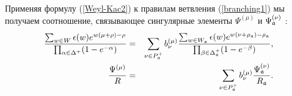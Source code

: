Применяя формулу (\ref{Weyl-Kac2}) к правилам ветвления (\ref{branching1}) мы получаем соотношение, связывающее сингулярные элементы $\Psi ^{\left( \mu\right) }$ и $\Psi _{\mathfrak{a}}^{\left( \nu \right) }$ :
\begin{eqnarray}
\frac{\sum_{w \in W}\epsilon (w )e^{w (\mu +\rho )-\rho }}{\prod_{\alpha \in
\Delta ^{+}}(1-e^{-\alpha })} &=&\sum_{\nu \in P_{\af}^{+}}b_{\nu
}^{(\mu )}\frac{\sum_{w \in W_{\af}}\epsilon (w )e^{w (\nu +\rho _{%
\af})-\rho _{\af}}}{\prod_{\beta \in \Delta _{\af%
}^{+}}(1-e^{-\beta })},  \nonumber  \label{eq:4} \\
\frac{\Psi ^{\left( \mu \right) }}{R} &=&\sum_{\nu \in P_{\af%
}^{+}}b_{\nu }^{(\mu )}\frac{\Psi _{\af}^{\left( \nu \right) }}{R_{%
\af}}.  \label{singular main}
\end{eqnarray}

